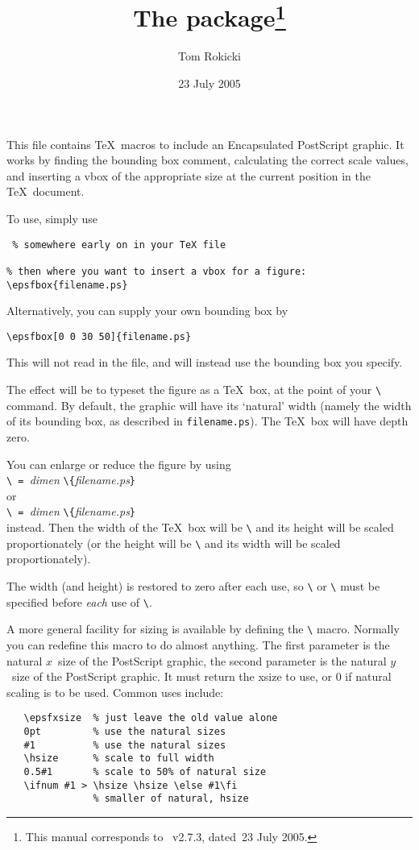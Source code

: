 \documentclass[DIV=9, pagesize=auto]{scrartcl}
\title{The \pkg{epsf} package\thanks{This manual corresponds to \pkg{epsf}~v2.7.3, dated~23 July 2005.}}
\author{Tom Rokicki\\\mail{rokicki@cs.stanford.edu}}
\date{23 July 2005}
\makeatletter
\newcommand*{\cs}[1]{\texttt{\textbackslash#1}}
\newcommand*{\cmd}[1]{\cs{\expandafter\@gobble\string#1}}
\newcommand*{\meta}[1]{\textlangle\textsl{#1}\textrangle}
\newcommand*{\marg}[1]{\texttt{\{}\meta{#1}\texttt{\}}}
\makeatother
\begin{document}
\maketitle

\noindent
This file contains \TeX\ macros to include an
Encapsulated PostScript graphic.  It works
by finding the bounding box comment,
calculating the correct scale values, and
inserting a vbox of the appropriate size at
the current position in the \TeX\ document.

To use, simply use
%
\begin{verbatim}
 % somewhere early on in your TeX file

% then where you want to insert a vbox for a figure:
\epsfbox{filename.ps}
\end{verbatim}

Alternatively, you can supply your own
bounding box by
%
\begin{verbatim}
\epsfbox[0 0 30 50]{filename.ps}
\end{verbatim}
%
This will not read in the file, and will
instead use the bounding box you specify.

The effect will be to typeset the figure as
a \TeX\ box, at the point of your \cmd{\epsfbox}
command. By default, the graphic will have
its `natural' width (namely the width of
its bounding box, as described in
\texttt{filename.ps}). The \TeX\ box will have depth
zero.

You can enlarge or reduce the figure by
using\\
\cmd{\epsfxsize\ = }\meta{dimen} \cmd{\epsfbox}\marg{filename.ps}\\
or\\
\cmd{\epsfysize\ = }\meta{dimen} \cmd{\epsfbox}\marg{filename.ps}\\
instead. Then the width of the \TeX\ box will
be \cmd{\epsfxsize} and its height will be scaled
proportionately (or the height will be
\cmd{\epsfysize} and its width will be scaled
proportionately).

The width (and height) is restored to zero
after each use, so \cmd{\epsfxsize} or \cmd{\epsfysize}
must be specified before \emph{each} use of
\cmd{\epsfbox}.

A more general facility for sizing is
available by defining the \cmd{\epsfsize} macro.
Normally you can redefine this macro to do
almost anything.  The first parameter is
the natural $x$~size of the PostScript
graphic, the second parameter is the
natural $y$~size of the PostScript graphic.
It must return the xsize to use, or 0 if
natural scaling is to be used.  Common uses
include:
%
\begin{verbatim}
   \epsfxsize  % just leave the old value alone
   0pt         % use the natural sizes
   #1          % use the natural sizes
   \hsize      % scale to full width
   0.5#1       % scale to 50% of natural size
   \ifnum #1 > \hsize \hsize \else #1\fi
               % smaller of natural, hsize
\end{verbatim}
\end{document}

